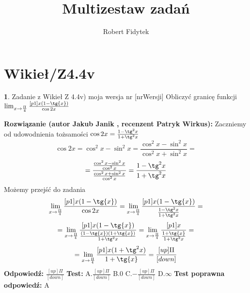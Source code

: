 \documentclass[12pt, a4paper]{article}
\title{Multizestaw zadań}
\author{Robert Fidytek}
\date{}
\theoremstyle{definition} %
\newtheorem{zad}{}
\newcommand{\kategoria}[1]{\section{#1}} %
\newcommand{\zadStart}[1]{\begin{zad}#1\newline} %
\newcommand{\zadStop}{\end{zad}}   %
\newcommand{\rozwStart}[2]{\noindent \textbf{Rozwiązanie (autor #1 , recenzent #2): }\newline} %
\newcommand{\rozwStop}{\newline}                                            %
\newcommand{\odpStart}{\noindent \textbf{Odpowiedź:}\newline}    %
\newcommand{\odpStop}{\newline}                                             %
\newcommand{\testStart}{\noindent \textbf{Test:}\newline} %
\newcommand{\testStop}{\newline} %
\newcommand{\kluczStart}{\noindent \textbf{Test poprawna odpowiedź:}\newline} %
\newcommand{\kluczStop}{\newline} %
\begin{document}
\maketitle


\kategoria{Wikieł/Z4.4v}
\zadStart{Zadanie z Wikieł Z 4.4v) moja wersja nr [nrWersji]}
Obliczyć granicę funkcji $\lim_{x \to \frac{\Pi}{4}} \frac{[p1]x(1-\tg{x})}{\cos{2x}}$
\zadStop
\rozwStart{Jakub Janik}{Patryk Wirkus}
Zaczniemy od udowodnienia tożsamości $\cos{2x}=\frac{1-\tg^2{x}}{1+\tg^2{x}}$
$$\cos{2x}=\cos^2{x}-\sin^2{x}=\frac{\cos^2{x}-\sin^2{x}}{\cos^2{x}+\sin^2{x}}=$$
$$=\frac{\frac{\cos^2{x}-\sin^2{x}}{\cos^2{x}}}{\frac{\cos^2{x}+\sin^2{x}}{\cos^2{x}}}=\frac{1-\tg^2{x}}{1+\tg^2{x}}$$
Możemy przejść do zadania
$$\lim_{x \to \frac{\Pi}{4}} \frac{[p1]x(1-\tg{x})}{\cos{2x}}=\lim_{x \to \frac{\Pi}{4}} \frac{[p1]x(1-\tg{x})}{\frac{1-\tg^2{x}}{1+\tg^2{x}}}=$$
$$=\lim_{x \to \frac{\Pi}{4}} \frac{[p1]x(1-\tg{x})}{\frac{(1-\tg{x})(1+\tg{x})}{1+\tg^2{x}}}=\lim_{x \to \frac{\Pi}{4}} \frac{[p1]x}{\frac{1+\tg{x}}{1+\tg^2{x}}}=$$
$$=\lim_{x \to \frac{\Pi}{4}} \frac{[p1]x(1+\tg^2{x})}{1+\tg{x}}=\frac{[up]\Pi}{[down]}$$
\rozwStop
\odpStart
$\frac{[up]\Pi}{[down]}$
\odpStop
\testStart
A.$\frac{[up]\Pi}{[down]}$
B.$0$
C.$-\frac{[up]\Pi}{[down]}$
D.$\infty$
\testStop
\kluczStart
A
\kluczStop
\end{document}
